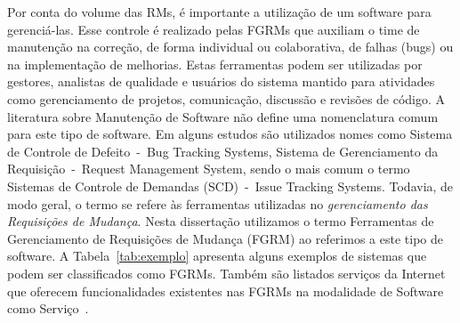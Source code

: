 
Por conta do volume das RMs, é importante a utilização de um software para
gerenciá-las. Esse controle é realizado pelas FGRMs que auxiliam o time de
manutenção na correção, de forma individual ou colaborativa, de falhas (bugs) ou
na implementação de melhorias. Estas ferramentas podem ser utilizadas por
gestores, analistas de qualidade e usuários do sistema mantido para atividades
como gerenciamento de projetos, comunicação, discussão e revisões de código. A
literatura sobre Manutenção de Software não define uma nomenclatura comum para
este tipo de software. Em alguns estudos são utilizados nomes como Sistema de
Controle de Defeito~-~Bug Tracking Systems, Sistema de Gerenciamento da
Requisição~-~Request Management System, sendo o mais comum o termo Sistemas de
Controle de Demandas (SCD)~-~Issue Tracking Systems. Todavia, de modo geral, o
termo se refere às ferramentas utilizadas no \textit{gerenciamento das
    Requisições de Mudança}. Nesta dissertação utilizamos o termo Ferramentas de
Gerenciamento de Requisições de Mudança (FGRM) ao referimos a este tipo de
software. A Tabela~\ref{tab:exemplo} apresenta alguns exemplos de sistemas que
podem ser classificados como FGRMs. Também são listados serviços da Internet que
oferecem funcionalidades existentes nas FGRMs na modalidade de Software como
Serviço~\cite{fox2013engineering}.

\begin{table}[htpb]
\centering
{}
\caption{Exemplos de ferramentas e serviços da Internet que podem ser
    classificados como FGRMs. Extraído de~\cite{cavalcanti2014challenges}}
\label{tab:exemplo}
\end{table}

